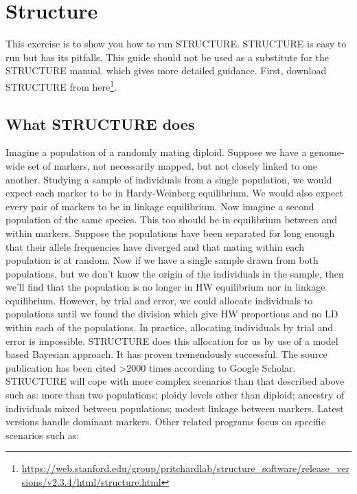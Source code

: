 \documentclass[
]{book}
\renewcommand{\href}[2]{#2\footnote{\url{#1}}}
\begin{document}
\hypertarget{structure}{%
\section{Structure}\label{structure}}

This exercise is to show you how to run STRUCTURE. STRUCTURE is easy to run but has its pitfalls. This guide should not be used as a substitute for the STRUCTURE manual, which gives more detailed guidance. First, download STRUCTURE from \href{https://web.stanford.edu/group/pritchardlab/structure_software/release_versions/v2.3.4/html/structure.html}{here}.

\hypertarget{what-structure-does}{%
\subsection{What STRUCTURE does}\label{what-structure-does}}

Imagine a population of a randomly mating diploid. Suppose we have a genome-wide set of markers, not necessarily mapped, but not closely linked to one another. Studying a sample of individuals from a single population, we would expect each marker to be in Hardy-Weinberg equilibrium. We would also expect every pair of markers to be in linkage equilibrium. Now imagine a second population of the same species. This too should be in equilibrium between and within markers. Suppose the populations have been separated for long enough that their allele frequencies have diverged and that mating within each population is at random. Now if we have a single sample drawn from both populations, but we don't know the origin of the individuals in the sample, then we'll find that the population is no longer in HW equilibrium nor in linkage equilibrium. However, by trial and error, we could allocate individuals to populations until we found the division which give HW proportions and no LD within each of the populations. In practice, allocating individuals by trial and error is impossible. STRUCTURE does this allocation for us by use of a model based Bayesian approach. It has proven tremendously successful. The source publication has been cited \textgreater2000 times according to Google Scholar. STRUCTURE will cope with more complex scenarios than that described above such as: more than two populations; ploidy levels other than diploid; ancestry of individuals mixed between populations; modest linkage between markers. Latest versions handle dominant markers. Other related programs focus on specific scenarios such as:
\end{document}
